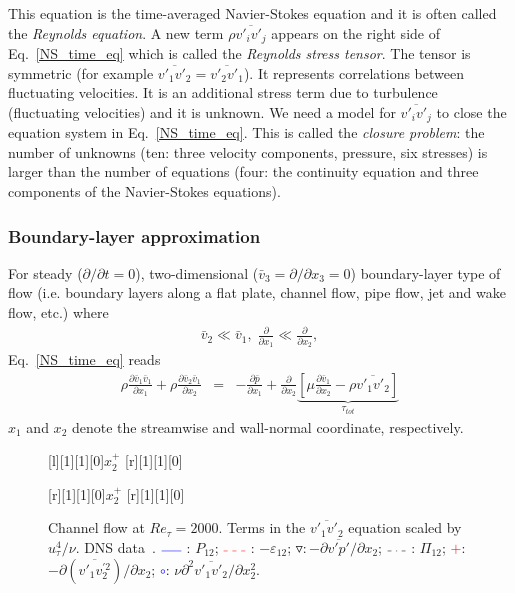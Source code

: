 \documentclass[a4paper]{article}
\def\D{\partial}
\def\e{\varepsilon}
\def\e{\varepsilon}
\def\vb{\bar{v}}
\def\pb{\bar{p}}
\def\vij{\overline{v'_iv'_j}}
\def\solidline{{$\textcolor{blue}{\overline{\hskip 0.5cm}}\ $}}
\def\dashedline{{$\textcolor{red}{\overline{\hskip 0.1cm}\ \overline{\hskip 0.1cm}\ \overline{\hskip 0.1cm}\ }$}}
\def\dashdottedline{$\overline{\hskip 0.1cm}\ \overline{\hskip 0.03cm}\ \overline{\hskip 0.1cm}\ $}
\begin{document}
\label{closure}
This equation is the time-averaged Navier-Stokes equation and it is often called
the \emph{Reynolds equation}.
A new term $\rho\vij$ appears on the right side of Eq.~\ref{NS_time_eq} which
is called the \emph{Reynolds stress tensor}. The tensor is symmetric
(for example $\overline{v'_1v'_2} = \overline{v'_2v'_1}$). It represents correlations
between fluctuating velocities. It is an additional stress term due to 
turbulence (fluctuating velocities) and it is unknown. We need a model
for $\vij$ to close the equation system in Eq.~\ref{NS_time_eq}.
This is called the \emph{closure problem}: the number of unknowns (ten:
 three velocity components, pressure, six stresses) is
larger than the number of equations (four: the continuity equation and
three components of the Navier-Stokes equations).

\subsubsection{Boundary-layer approximation}

For steady  ($\D /\D t=0$), two-dimensional ($\vb_3 = \D /\D x_3=0$) boundary-layer type of flow (i.e. boundary layers
along a flat plate, channel flow, pipe flow, jet and wake flow, etc.) where
%
\begin{eqnarray}
\label{bound_layer_approx_eq}
\vb_2 \ll \vb_1, \; \frac{\D}{\D x_1} \ll \frac{\D}{\D x_2},
\end{eqnarray}
%
Eq.~\ref{NS_time_eq} reads
%
\begin{eqnarray}
\label{NS_time_eq_b}
\rho \frac{\D \vb_1 \vb_1}{\D x_1} + \rho \frac{\D \vb_2 \vb_1}{\D x_2}  &=&
- \frac{\D \pb}{\D x_1} + \frac{\D}{\D x_2}\underbrace{ \left[\mu \frac{\D \vb_1}{\D x_2}
 - \rho \overline{v'_1v'_2}\right]}_{\tau_{tot}} 
\end{eqnarray}
%
$x_1$  and  $x_2$ denote
the streamwise and wall-normal coordinate, respectively.

\begin{figure}[bt]
\centering
\begin{minipage}[b]{0.5\textwidth}
[l][1][1][0]{$x_2^+$}
[r][1][1][0]{}
\end{minipage}%
\begin{minipage}[b]{0.5\textwidth}
[r][1][1][0]{$x_2^+$}
[r][1][1][0]{}
\end{minipage}
\caption{Channel flow at $Re_\tau=2000$. Terms in the $\overline{v'_1v'_2}$ equation scaled by $u_\tau^4/\nu$.
DNS data~\cite{hoyas:jimenez:06,hoyas:jimenez:web:data}.
\solidline: $P_{12}$;
\dashedline: $-\e_{12}$;
$\triangledown: -\D\overline{v'p'}/\D x_2$;
\dashdottedline: $\Pi_{12}$;
\textcolor{red}{$+$}: $-\D(\overline{v'_1v^{\prime 2}_2})/\D x_2$;
\textcolor{blue}{$\circ$}: $\nu \D^2\overline{v'_1v'_2}/\D x_2^2$.}
\label{uv_balance}
\end{figure}
\end{document}
